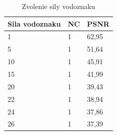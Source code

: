 \begin{table}[ht]
\centering
\label{wm-strength}
\begin{tabular}{lll}
\hline
\multicolumn{1}{c}{\textbf{Sila vodoznaku}} & \multicolumn{1}{c}{\textbf{NC}} & \multicolumn{1}{c}{\textbf{PSNR}} \\ \hline
1                              & 1                               & 62,95 \\
5                              & 1                               & 51,64 \\
10                             & 1                               & 45,91 \\
15                             & 1                               & 41,99 \\
20                             & 1                               & 39,43 \\
22                             & 1                               & 38,94 \\
24                             & 1                               & 37,86 \\
26                             & 1                               & 37,39 \\ \hline
\end{tabular}
\caption{Zvolenie sily vodoznaku}
\end{table}

